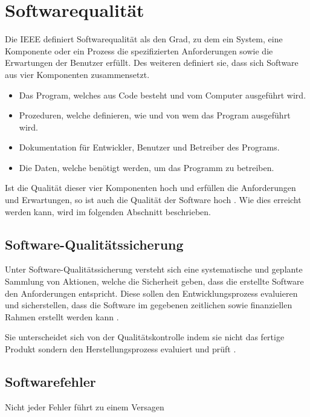 
\section{Softwarequalität}\label{softwarequality}
Die \ac{IEEE} definiert Softwarequalität als den Grad, zu dem ein System,
eine Komponente oder ein Prozess die spezifizierten Anforderungen sowie die Erwartungen der Benutzer erfüllt.
Des weiteren definiert sie, dass sich Software aus vier Komponenten zusammensetzt.
\begin{itemize}
   \item Das Program, welches aus Code besteht und vom Computer ausgeführt wird.
   \item Prozeduren, welche definieren, wie und von wem das Program ausgeführt wird.
   \item Dokumentation für Entwickler, Benutzer und Betreiber des Programs.
   \item Die Daten, welche benötigt werden, um das Programm zu betreiben.
\end{itemize}
Ist die Qualität dieser vier Komponenten hoch und erfüllen die Anforderungen und Erwartungen,
so ist auch die Qualität der Software hoch \parencite{galin2004software}.
Wie dies erreicht werden kann, wird im folgenden Abschnitt beschrieben.

\subsection{Software-Qualitätssicherung}
Unter Software-Qualitätssicherung versteht sich eine systematische und geplante Sammlung von Aktionen, 
welche die Sicherheit geben, dass die erstellte Software den Anforderungen entspricht.
Diese sollen den Entwicklungsprozess evaluieren und sicherstellen,
dass die Software im gegebenen zeitlichen sowie finanziellen Rahmen erstellt werden kann \parencite{galin2004software}. 

Sie unterscheidet sich von der Qualitätskontrolle indem sie nicht das fertige Produkt sondern den Herstellungsprozess evaluiert und prüft \parencite{galin2004software}.


\subsection{Softwarefehler}
Nicht jeder Fehler führt zu einem Versagen

